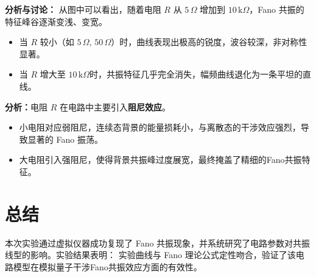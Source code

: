 \documentclass[12pt]{article}
\begin{document}
\textbf{分析与讨论：}
从图中可以看出，随着电阻 $R$ 从 $5\,\Omega$ 增加到 $10\,\text{k}\Omega$，Fano 共振的特征峰谷逐渐变浅、变宽。
    \begin{itemize}
        \item 当 $R$ 较小（如 $5\,\Omega$, $50\,\Omega$）时，曲线表现出极高的锐度，波谷较深，非对称性显著。
        \item 当 $R$ 增大至 $10\,\text{k}\Omega$时，共振特征几乎完全消失，幅频曲线退化为一条平坦的直线。
    \end{itemize}
    
    \textbf{分析：}电阻 $R$ 在电路中主要引入\textbf{阻尼效应}。
    \begin{itemize}
        \item 小电阻对应弱阻尼，连续态背景的能量损耗小，与离散态的干涉效应强烈，导致显著的 Fano 振荡。
        \item 大电阻引入强阻尼，使得背景共振峰过度展宽，最终掩盖了精细的Fano共振特征。
    \end{itemize}

\section{总结}
\hspace{2em}
本次实验通过虚拟仪器成功复现了 Fano 共振现象，并系统研究了电路参数对共振线型的影响。实验结果表明：
实验曲线与 Fano 理论公式定性吻合，验证了该电路模型在模拟量子干涉Fano共振效应方面的有效性。
\end{document}
